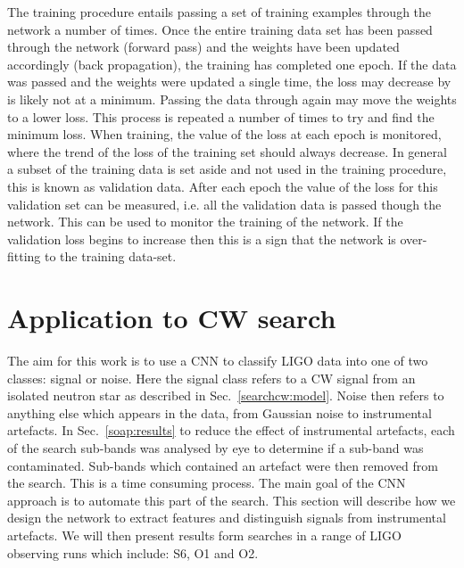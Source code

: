 The training procedure entails passing a set of training examples through the network a number of times. 
Once the entire training data set has been passed through the network (forward pass) and the weights have been updated accordingly (back propagation), the training has completed one epoch.
If the data was passed and the weights were updated a single time, the loss may decrease by is likely not at a minimum.
Passing the data through again may move the weights to a lower loss.
This process is repeated a number of times to try and find the minimum loss.
When training, the value of the loss at each epoch is monitored, where the trend of the loss of the training set should always decrease. 
In general a subset of the training data is set aside and not used in the training procedure, this is known as validation data. 
After each epoch the value of the loss for this validation set can be measured, i.e. all the validation data is passed though the network. 
This can be used to monitor the training of the network. If the validation loss begins to increase then this is a sign that the network is over-fitting to the training data-set.


\section{\label{machine:cw}Application to CW search}

The aim for this work is to use a \gls{CNN} to classify \gls{LIGO} data into one of two classes: signal or noise.
Here the signal class refers to a \gls{CW} signal from an isolated neutron star as described in Sec.~\ref{searchcw:model}.
Noise then refers to anything else which appears in the data, from Gaussian noise to instrumental artefacts. 
In Sec.~\ref{soap:results} to reduce the effect of instrumental artefacts, each of the search sub-bands was analysed by eye to determine if a sub-band was contaminated. 
Sub-bands which contained an artefact were then removed from the search.
This is a time consuming process. The main goal of the \gls{CNN} approach is to automate this part of the search.
This section will describe how we design the network to extract features and distinguish signals from instrumental artefacts.
We will then present results form searches in a range of \gls{LIGO} observing runs which include: S6, O1 and O2.


